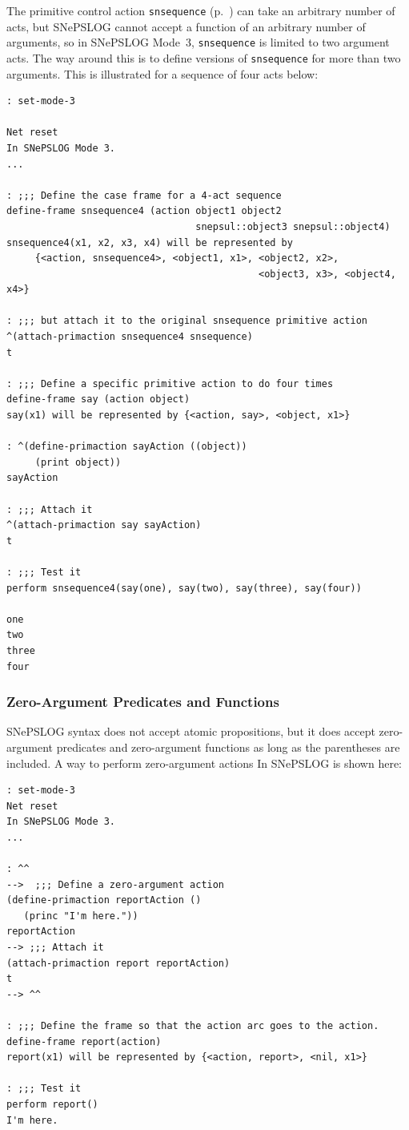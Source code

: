 \documentclass{book}
\begin{document}
The primitive control action \texttt{snsequence}
(p.~\pageref{snsequencedescr}) can take an arbitrary number of acts,
but SNePSLOG cannot accept a function of an arbitrary number of
arguments, so in SNePSLOG Mode~3, \texttt{snsequence} is limited to
two argument acts.  The way around this is to define versions of
\texttt{snsequence} for more than two arguments.  This is illustrated
for a sequence of four acts below:
\begin{verbatim}
: set-mode-3

Net reset
In SNePSLOG Mode 3.
...

: ;;; Define the case frame for a 4-act sequence
define-frame snsequence4 (action object1 object2 
                                 snepsul::object3 snepsul::object4)
snsequence4(x1, x2, x3, x4) will be represented by
     {<action, snsequence4>, <object1, x1>, <object2, x2>,
                                            <object3, x3>, <object4, x4>}

: ;;; but attach it to the original snsequence primitive action
^(attach-primaction snsequence4 snsequence)
t

: ;;; Define a specific primitive action to do four times
define-frame say (action object)
say(x1) will be represented by {<action, say>, <object, x1>}

: ^(define-primaction sayAction ((object))
     (print object))
sayAction

: ;;; Attach it
^(attach-primaction say sayAction)
t

: ;;; Test it
perform snsequence4(say(one), say(two), say(three), say(four))

one 
two 
three 
four 
\end{verbatim}

\subsubsection{Zero-Argument Predicates and Functions}
SNePSLOG syntax does not accept atomic propositions, but it does
accept zero-argument predicates and zero-argument functions as long
as the parentheses are included.  A way to perform zero-argument
actions In SNePSLOG is shown here:
\begin{verbatim}
: set-mode-3
Net reset
In SNePSLOG Mode 3.
...

: ^^
-->  ;;; Define a zero-argument action
(define-primaction reportAction ()
   (princ "I'm here."))
reportAction
--> ;;; Attach it
(attach-primaction report reportAction)
t
--> ^^

: ;;; Define the frame so that the action arc goes to the action.
define-frame report(action)
report(x1) will be represented by {<action, report>, <nil, x1>}

: ;;; Test it
perform report()
I'm here.
\end{verbatim}
\end{document}
